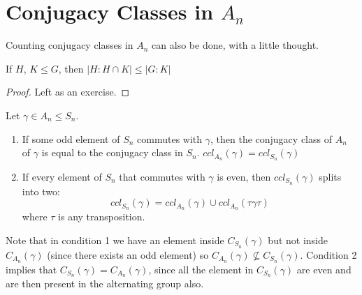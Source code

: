 \documentclass[../Main.tex]{subfiles}
\begin{document}
\section{Conjugacy Classes in \texorpdfstring{$A_n$}{An}}
Counting conjugacy classes in $A_n$ can also be done, with a little thought.
\begin{proposition}
    If $H$, $K \leq G$, then $|H : H \cap K| \leq |G : K|$
    \label{propSubgroupIndices}
\end{proposition}
\begin{proof}
Left as an exercise.
\end{proof}%
\begin{lemma}
    Let $\gamma \in A_n \leq S_n$.
    \begin{enumerate}
        \item If some odd element of $S_n$ commutes with $\gamma$, then the conjugacy class of $A_n$ of $\gamma$ is equal to the conjugacy class in $S_n$. $ccl_{A_n}(\gamma) = ccl_{S_n}(\gamma)$
        \item If every element of $S_n$ that commutes with $\gamma$ is even, then $ccl_{S_n}(\gamma)$ splits into two:
        \begin{equation*}
            ccl_{S_n}(\gamma) = ccl_{A_n}(\gamma) \cup ccl_{A_n}(\tau\gamma\tau) 
        \end{equation*}
        where $\tau$ is any transposition.
    \end{enumerate}
    \label{lemConjugacyAn}
\end{lemma}
Note that in condition 1 we have an element inside $C_{S_n}(\gamma)$ but not inside $C_{A_n}(\gamma)$ (since there exists an odd element) so $C_{A_n}(\gamma) \nsubseteq C_{S_n}(\gamma)$. Condition 2 implies that $C_{S_n}(\gamma) = C_{A_n}(\gamma)$, since all the element in $C_{S_n}(\gamma)$ are even and are then present in the alternating group also.\par
\end{document}
